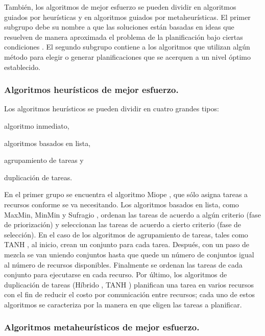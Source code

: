 También, los algoritmos de mejor esfuerzo se pueden dividir en algoritmos guiados por heurísticas y en algoritmos guiados por metaheurísticas. El primer subgrupo debe su nombre a que las soluciones están basadas en ideas que resuelven de manera aproximada el problema de la planificación bajo ciertas condiciones \cite{yu2008workflow}. El segundo subgrupo contiene a los algoritmos que utilizan algún método para elegir o generar planificaciones que se acerquen a un nivel óptimo establecido.

\subsubsection{Algoritmos heurísticos de mejor esfuerzo.}

Los algoritmos heurísticos se pueden dividir en cuatro grandes tipos: 
\begin{enumerate*}[label=\alph*)]
\item{algoritmo inmediato,}
\item{algoritmos basados en lista,}
\item{agrupamiento de tareas y}
\item{duplicación de tareas.}
\end{enumerate*}

En el primer grupo se encuentra el algoritmo Miope \cite{ramamritham1990efficient}, que sólo asigna tareas a recursos conforme se va necesitando. Los algoritmos basados en lista, como MaxMin, MinMin y Sufragio \cite{maheswaran1999dynamic}, ordenan las tareas de acuerdo a algún criterio (fase de priorización) y seleccionan las tareas de acuerdo a cierto criterio (fase de selección). En el caso de los algoritmos de agrupamiento de tareas, tales como TANH \cite{bajaj2004improving}, al inicio, crean un conjunto para cada tarea. Después, con un paso de mezcla se van uniendo conjuntos hasta que quede un número de conjuntos igual al número de recursos disponibles. Finalmente se ordenan las tareas de cada conjunto para ejecutarse en cada recurso. Por último, los algoritmos de duplicación de tareas (Híbrido \cite{sakellariou2004hybrid}, TANH \cite{bajaj2004improving}) planifican una tarea en varios recursos con el fin de reducir el costo por comunicación entre recursos; cada uno de estos algoritmos se caracteriza por la manera en que eligen las tareas a planificar.


\subsubsection{Algoritmos metaheurísticos de mejor esfuerzo.}

